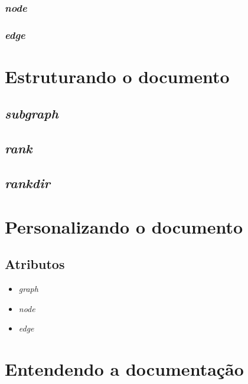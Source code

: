 \documentclass[a4paper,12pt]{article}
\begin{document}
      \subsubsection{\emph{node}}

      \subsubsection{\emph{edge}}


  \section{Estruturando o documento}

    \subsection{\emph{subgraph}}

    \subsection{\emph{rank}}

    \subsection{\emph{rankdir}}
    \break

  \section{Personalizando o documento}

    \subsection{Atributos}

      \begin{itemize}
        \item{\emph{graph}}

        \item{\emph{node}}

        \item{\emph{edge}}
      \end{itemize}

  \section{Entendendo a documentação}
\end{document}
